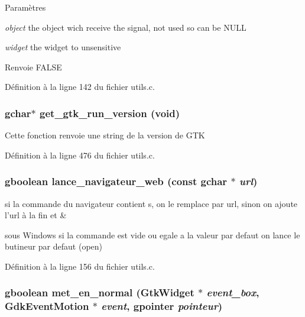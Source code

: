\begin{DoxyParams}{Paramètres}
\item[{\em object}]the object wich receive the signal, not used so can be NULL \item[{\em widget}]the widget to unsensitive\end{DoxyParams}
\begin{DoxyReturn}{Renvoie}
FALSE 
\end{DoxyReturn}


Définition à la ligne 142 du fichier utils.c.

\subsubsection[{get\_\-gtk\_\-run\_\-version}]{\setlength{\rightskip}{0pt plus 5cm}gchar$\ast$ get\_\-gtk\_\-run\_\-version (void)}\label{utils_8c_ae9b947fc18c3a21dcefe736a902a4926}
Cette fonction renvoie une string de la version de GTK 

Définition à la ligne 476 du fichier utils.c.

\subsubsection[{lance\_\-navigateur\_\-web}]{\setlength{\rightskip}{0pt plus 5cm}gboolean lance\_\-navigateur\_\-web (const gchar $\ast$ {\em url})}\label{utils_8c_ac95e13303adfcd6b449afd319bc040ab}
si la commande du navigateur contient s, on le remplace par url, sinon on ajoute l'url à la fin et \&

sous Windows si la commande est vide ou egale a la valeur par defaut on lance le butineur par defaut (open) 

Définition à la ligne 156 du fichier utils.c.

\subsubsection[{met\_\-en\_\-normal}]{\setlength{\rightskip}{0pt plus 5cm}gboolean met\_\-en\_\-normal (GtkWidget $\ast$ {\em event\_\-box}, \/  GdkEventMotion $\ast$ {\em event}, \/  gpointer {\em pointeur})}\label{utils_8c_ab19e8857d0718043a43d7e4e9256f717}


